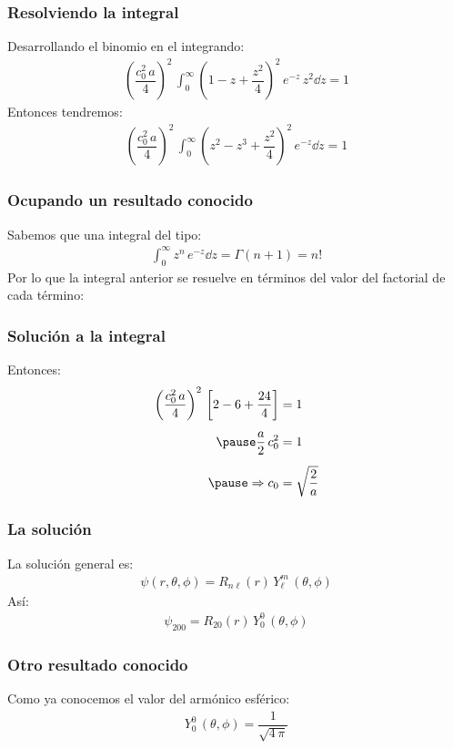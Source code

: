 \begin{frame}
\frametitle{Resolviendo la integral}
Desarrollando el binomio en el integrando:
\begin{align*}
\left( \dfrac{c_{0}^{2} \, a}{4} \right)^{2} \, \int_{0}^{\infty} \left( 1 - z + \dfrac{z^{2}}{4} \right)^{2} \, e^{-z} \, z^{2} \dd{z} = 1
\end{align*}
\pause
Entonces tendremos:
\begin{align*}
\left( \dfrac{c_{0}^{2} \, a}{4}\right)^{2} \, \int_{0}^{\infty} \left( z^{2} - z^{3} + \dfrac{z^{2}}{4} \right)^{2} \, e^{-z} \dd{z} = 1
\end{align*}
\end{frame}
\begin{frame}
\frametitle{Ocupando un resultado conocido}
Sabemos que una integral del tipo:
\begin{align*}
\int_{0}^{\infty} z^{n} \, e^{-z} \dd{z} = \Gamma(n + 1) = n!
\end{align*}
\pause
Por lo que la integral anterior se resuelve en términos del valor del factorial de cada término:
\end{frame}
\begin{frame}
\frametitle{Solución a la integral}
Entonces:
\begin{equation*}
\begin{aligned}
\left( \dfrac{c_{0}^{2} \, a}{4} \right)^{2} \, \left[ 2 - 6 + \dfrac{24}{4} \right]  &= 1 \\[0.5em] \pause
\dfrac{a}{2} \, c_{0}^{2} &= 1 \\[0.5em] \pause
\Rightarrow c_{0} &= \sqrt{\dfrac{2}{a}}
\end{aligned}
\end{equation*}
\end{frame}
\begin{frame}
\frametitle{La solución}
La solución general es:
\begin{align*}
\psi(r, \theta, \phi) = R_{n \ell} (r) \, Y_{\ell}^{m} \, (\theta, \phi)
\end{align*}
\pause
Así:
\begin{align*}
\psi_{200} = R_{2 0} (r) \, Y_{0}^{0} \, (\theta, \phi)
\end{align*}
\end{frame}
\begin{frame}
\frametitle{Otro resultado conocido}
Como ya conocemos el valor del armónico esférico:
\begin{align*}
Y_{0}^{0} \, (\theta, \phi) = \dfrac{1}{\sqrt{4 \, \pi}}
\end{align*}
\end{frame}
